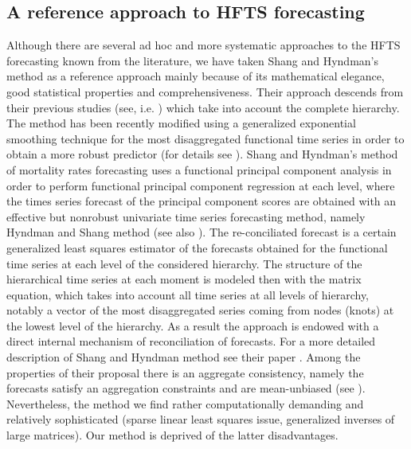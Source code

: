 \documentclass[12pt,a4paper]{article}
\numberwithin{equation}{section}
\begin{document}
\subsection{A reference approach to HFTS forecasting}
Although there are several ad hoc and more systematic approaches to the HFTS forecasting known from the literature, we have taken Shang and Hyndman's method as a reference approach mainly because of its mathematical elegance, good statistical properties and comprehensiveness. Their approach descends from their previous studies (see, i.e. \cite{Shang}) which take into account the complete hierarchy.
The method has been recently modified using a generalized exponential
smoothing technique for the most disaggregated functional time series in order to obtain a more robust predictor (for details see \cite{SIT}).
Shang and Hyndman's method of mortality rates forecasting uses a functional principal component analysis in order to perform functional principal component regression at each level, where the times series forecast of the principal component scores are obtained with an effective but nonrobust univariate time series forecasting method, namely Hyndman and Shang \cite{HS2009} method (see also \cite{KosFuncReg}). 
The re-conciliated forecast is a certain generalized least squares estimator of the forecasts obtained for the functional time series at each level of the considered hierarchy. 
The structure of the hierarchical time series at each moment is modeled then with the matrix equation, which takes into account all time series at all levels of hierarchy, notably a vector of the most disaggregated series coming from nodes (knots) at the lowest level of the hierarchy. 
As a result the approach is endowed with a direct internal mechanism of reconciliation of forecasts.
For a more detailed description of Shang and Hyndman method see their paper \cite{Shang}.
Among the properties of their proposal there is an aggregate consistency, namely the forecasts satisfy an aggregation constraints and are mean-unbiased (see \cite{Shang}). Nevertheless, the method we find rather computationally demanding and relatively sophisticated (sparse linear least squares issue, generalized inverses of large matrices). Our method is deprived of the latter disadvantages.
\end{document}
